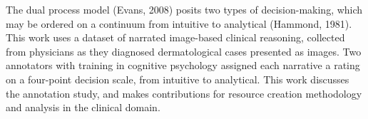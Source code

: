 The dual process model (Evans, 2008) posits two types of decision-making, which may be ordered on a continuum from intuitive to analytical (Hammond, 1981). This work uses a dataset of narrated image-based clinical reasoning, collected from physicians as they diagnosed dermatological cases presented as images. Two annotators with training in cognitive psychology assigned each narrative a rating on a four-point decision scale, from intuitive to analytical. This work discusses the annotation study, and makes contributions for resource creation methodology and analysis in the clinical domain.
